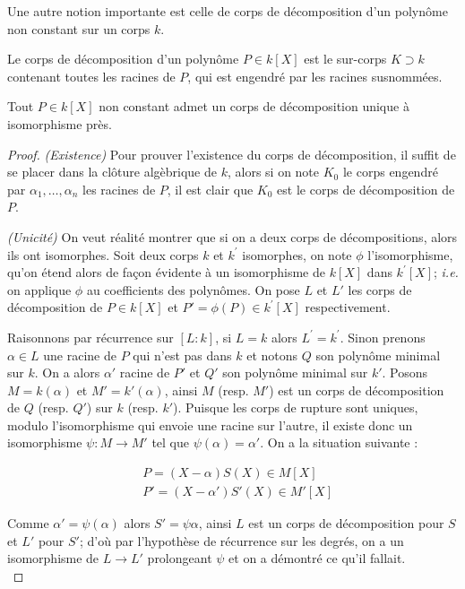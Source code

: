 \documentclass[a4paper]{article} %
\numberwithin{section}{part}
\numberwithin{equation}{section}
\begin{document}
Une autre notion importante est celle de corps de décomposition d'un polynôme 
non constant sur un corps $k$.

\begin{defn}
\label{def:dec}
Le corps de décomposition d'un polynôme $P\in k[X]$ est le sur-corps $K \supset 
k$ contenant toutes les racines de $P$, qui est engendré par les racines 
susnommées.
\end{defn}

\begin{thm}
\label{cor:dec}
Tout $P\in k[X]$ non constant admet un corps de décomposition unique à 
isomorphisme près.
\end{thm}
\begin{proof}
\textit{(Existence)}
Pour prouver l'existence du corps de décomposition, il suffit de se placer 
dans la clôture algèbrique de $k$, alors si on note $K_0$ le corps engendré 
par $\alpha_1,\dots,\alpha_n$ les racines de $P$, il est clair que $K_0$ est 
le corps de décomposition de $P$.\par
\textit{(Unicité)}
On veut réalité montrer que si on a deux corps de décompositions, alors ils ont
isomorphes. Soit deux corps $k$ et $k^{\prime}$ isomorphes, on note $\phi$
l'isomorphisme, qu'on étend alors de façon évidente à un isomorphisme de $k[X]$ 
dans $k^{\prime}[X]$; \textit{i.e.} on applique $\phi$ au coefficients des 
polynômes. On pose  $L$ et $L'$ les corps de décomposition de $P\in k[X]$ et $P'
= \phi(P) \in k^{\prime}[X]$ respectivement.\par
Raisonnons par récurrence sur $[L:k]$, si $L = k$ alors $L^{\prime} =
k^{\prime}$. Sinon prenons $\alpha\in L$ une racine de $P$ qui n'est pas dans
$k$ et notons $Q$ son polynôme minimal sur $k$. On a alors $\alpha'$ racine de 
$P'$ et $Q'$ son polynôme minimal sur $k'$. Posons $M = k(\alpha)$ et $M' =
k'(\alpha)$, ainsi $M$ (resp. $M'$) est un corps de décomposition de $Q$ (resp.
$Q'$) sur $k$ (resp. $k'$). Puisque les corps de rupture sont uniques, modulo
l'isomorphisme qui envoie une racine sur l'autre, il existe donc un isomorphisme
$\psi : M \to M'$ tel que $\psi(\alpha) = \alpha'$. On a la situation suivante :

\begin{align*}
&P = (X - \alpha)S(X)\in M[X]\\
&P' = (X - \alpha')S'(X)\in M'[X]
\end{align*}

Comme $\alpha' = \psi(\alpha)$ alors $S'=\psi{\alpha}$, ainsi $L$ est un corps
de décomposition pour $S$ et $L'$ pour $S'$; d'où par l'hypothèse de récurrence
sur les degrés, on a un isomorphisme de $L \to L'$ prolongeant $\psi$ et on a 
démontré ce qu'il fallait.\\
\end{proof}
\end{document}
